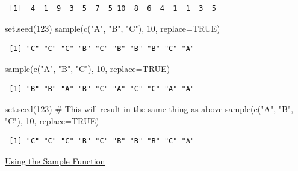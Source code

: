 \documentclass[
  letterpaper,
  DIV=11,
  numbers=noendperiod]{scrreprt}
\newenvironment{Shaded}{\begin{snugshade}}{\end{snugshade}}
\newcommand{\AttributeTok}[1]{\textcolor[rgb]{0.40,0.45,0.13}{#1}}
\newcommand{\CommentTok}[1]{\textcolor[rgb]{0.37,0.37,0.37}{#1}}
\newcommand{\ConstantTok}[1]{\textcolor[rgb]{0.56,0.35,0.01}{#1}}
\newcommand{\DecValTok}[1]{\textcolor[rgb]{0.68,0.00,0.00}{#1}}
\newcommand{\FunctionTok}[1]{\textcolor[rgb]{0.28,0.35,0.67}{#1}}
\newcommand{\NormalTok}[1]{\textcolor[rgb]{0.00,0.23,0.31}{#1}}
\newcommand{\StringTok}[1]{\textcolor[rgb]{0.13,0.47,0.30}{#1}}
\begin{document}
\begin{verbatim}
 [1]  4  1  9  3  5  7  5 10  8  6  4  1  1  3  5
\end{verbatim}

\begin{Shaded}
\begin{Highlighting}[]
\FunctionTok{set.seed}\NormalTok{(}\DecValTok{123}\NormalTok{)}
\FunctionTok{sample}\NormalTok{(}\FunctionTok{c}\NormalTok{(}\StringTok{"A"}\NormalTok{, }\StringTok{"B"}\NormalTok{, }\StringTok{"C"}\NormalTok{), }\DecValTok{10}\NormalTok{, }\AttributeTok{replace=}\ConstantTok{TRUE}\NormalTok{)}
\end{Highlighting}
\end{Shaded}

\begin{verbatim}
 [1] "C" "C" "C" "B" "C" "B" "B" "B" "C" "A"
\end{verbatim}

\begin{Shaded}
\begin{Highlighting}[]
\FunctionTok{sample}\NormalTok{(}\FunctionTok{c}\NormalTok{(}\StringTok{"A"}\NormalTok{, }\StringTok{"B"}\NormalTok{, }\StringTok{"C"}\NormalTok{), }\DecValTok{10}\NormalTok{, }\AttributeTok{replace=}\ConstantTok{TRUE}\NormalTok{)}
\end{Highlighting}
\end{Shaded}

\begin{verbatim}
 [1] "B" "B" "A" "B" "C" "A" "C" "C" "A" "A"
\end{verbatim}

\begin{Shaded}
\begin{Highlighting}[]
\FunctionTok{set.seed}\NormalTok{(}\DecValTok{123}\NormalTok{) }\CommentTok{\# This will result in the same thing as above}
\FunctionTok{sample}\NormalTok{(}\FunctionTok{c}\NormalTok{(}\StringTok{"A"}\NormalTok{, }\StringTok{"B"}\NormalTok{, }\StringTok{"C"}\NormalTok{), }\DecValTok{10}\NormalTok{, }\AttributeTok{replace=}\ConstantTok{TRUE}\NormalTok{)}
\end{Highlighting}
\end{Shaded}

\begin{verbatim}
 [1] "C" "C" "C" "B" "C" "B" "B" "B" "C" "A"
\end{verbatim}

\begin{watch}{}{}
    \href{https://youtu.be/8JwzbwIki-g}{Using the Sample Function}
\end{watch}
\end{document}
